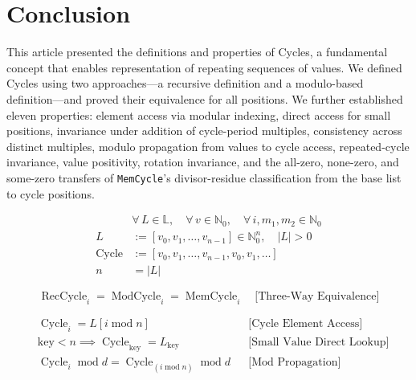 \section{Conclusion}

This article presented the definitions and properties of Cycles, a fundamental
concept that enables representation of repeating sequences of values. We
defined Cycles using two approaches---a recursive definition and a modulo-based
definition---and proved their equivalence for all positions. We further
established eleven properties: element access via modular indexing, direct
access for small positions, invariance under addition of cycle-period
multiples, consistency across distinct multiples, modulo propagation from
values to cycle access, repeated-cycle invariance, value positivity, rotation
invariance, and the all-zero, none-zero, and some-zero transfers of
\texttt{MemCycle}'s divisor-residue classification from the base list to cycle
positions.

\begin{equation*}
\begin{aligned}
&\forall\,L\in\mathbb{L},\quad \forall\,v\in\mathbb{N}_0,
  \quad \forall\,i,m_1,m_2\in\mathbb{N}_0 \\
L&:=[v_0,v_1,\dots,v_{n-1}]\in\mathbb{N}_0^n,\quad |L|>0 \\
\operatorname{Cycle}&:=[v_0,v_1,\dots,v_{n-1},v_0,v_1,\dots] \\
n&=|L|
\end{aligned}
\end{equation*}

\begin{equation*}
\operatorname{RecCycle}_i=\operatorname{ModCycle}_i
  =\operatorname{MemCycle}_i
  \quad \text{[Three-Way Equivalence]}
\end{equation*}

\begin{equation*}
\begin{aligned}
&\operatorname{Cycle}_i=L[i\operatorname{mod}n]
  && \text{[Cycle Element Access]} \\
&\text{key}<n\implies
  \operatorname{Cycle}_{\text{key}}=L_{\text{key}}
  && \text{[Small Value Direct Lookup]} \\
&\operatorname{Cycle}_i\operatorname{mod}d
  =\operatorname{Cycle}_{(i\operatorname{mod}n)}\operatorname{mod}d
  && \text{[Mod Propagation]}
\end{aligned}
\end{equation*}

